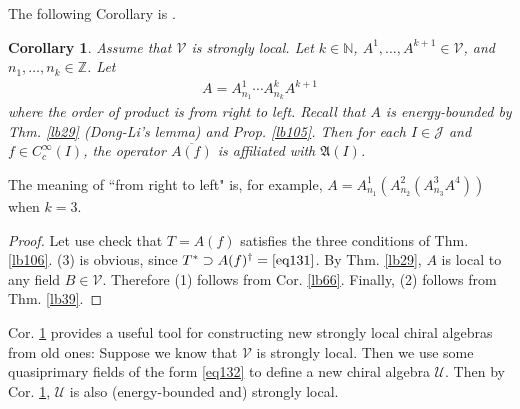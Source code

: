 \documentclass[12pt,b5paper,notitlepage]{article}
\theoremstyle{definition}
\theoremstyle{plain}
\newtheorem{co}[df]{Corollary}
\newcommand{\fk}{\mathfrak}
\newcommand{\mc}{\mathcal}
\newcommand{\ovl}{\overline}
\newcommand{\Nbb}{\mathbb N}
\newcommand{\Zbb}{\mathbb Z}
\newcommand{\MV}{\mathcal V}
\numberwithin{equation}{section}
\begin{document}
The following Corollary is \cite[Thm. 8.1]{CKLW18}.

\begin{co}\label{lb107}
Assume that $\MV$ is strongly local. Let $k\in\Nbb$, $A^1,\dots,A^{k+1}\in\MV$, and $n_1,\dots,n_k\in\Zbb$. Let
\begin{align}\label{eq132}
A=A^1_{n_1}\cdots A^k_{n_k}A^{k+1}
\end{align}
where the order of product is from right to left. Recall that $A$ is energy-bounded by Thm. \ref{lb29} (Dong-Li's lemma) and Prop. \ref{lb105}. Then for each $I\in\mc J$ and $f\in C_c^\infty(I)$, the operator $\ovl{A(f)}$ is affiliated with $\fk A(I)$.
\end{co}

The meaning of ``from right to left" is, for example, $A=A^1_{n_1}(A^2_{n_2}(A^3_{n_3}A^4))$ when $k=3$. 


\begin{proof}
Let use check that $T=A(f)$ satisfies the three conditions of Thm. \ref{lb106}. (3) is obvious, since $T^*\supset A(f)^\dagger=\eqref{eq131}$. By Thm. \ref{lb29}, $A$ is local to any field $B\in\MV$. Therefore (1) follows from Cor. \ref{lb66}. Finally, (2) follows from Thm. \ref{lb39}.
\end{proof}




Cor. \ref{lb107} provides a useful tool for constructing new strongly local chiral algebras from old ones: Suppose we know that $\MV$ is strongly local. Then we use some quasiprimary fields of the form \eqref{eq132} to define a new chiral algebra $\mc U$. Then by Cor. \ref{lb107}, $\mc U$ is also (energy-bounded and) strongly local.







































\newpage
\end{document}
